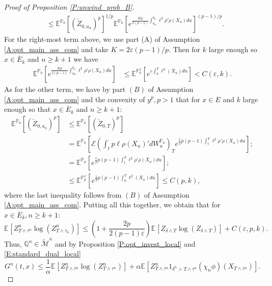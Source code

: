 \documentclass[11pt, letterpaper]{amsart}
\theoremstyle{definition}
\theoremstyle{remark}
\numberwithin{equation}{section}
\newcommand{\eps}{\varepsilon}
\newcommand{\prob}{\mathbb{P}}
\newcommand{\qprob}{\mathbb{Q}}
\newcommand{\esp}{\mathbb{E}}
\newcommand{\espalt}[2]{\esp^{#1}\bra{#2}}
\newcommand{\tM}{\widetilde{\mathcal{M}}}
\newcommand{\EN}{\mathcal{E}}
\newcommand{\bra}[1]{\left[#1\right]}
\newcommand{\ol}[1]{\overline{#1}}
\begin{document}
\begin{proof}[Proof of Proposition \ref{P:unwind_prob_B}]
\begin{equation*}
\begin{split}
&\leq \espalt{\prob_0}{\left(\check{Z}_{0,a_n}\right)^p}^{1/p}\espalt{\prob_0}{e^{\frac{Kp}{2(p-1)}\int_{a_n}^{b_n} \ell^2\rho'\rho(X_u)du}}^{(p-1)/p}.
\end{split}
\end{equation*}
For the right-most term above, we use part (A) of Assumption \ref{A:opt_main_ass_com} and take $K=2\eps(p-1)/p$. Then for $k$ large enough so $x\in\ol{E}_k$ and $n\geq k+1$ we have
\begin{equation*}
\begin{split}
\espalt{\prob_0}{e^{\frac{Kp}{2(p-1)}\int_{a_n}^{b_n} \ell^2\rho'\rho(X_u)du}} &\leq \espalt{\prob^x_0}{e^{\eps\int_0^T \ell^2(X_u)du}} < C(\eps, k).
\end{split}
\end{equation*}
As for the other term, we have by part $(B)$ of Assumption \ref{A:opt_main_ass_com} and the convexity of $y^p, p>1$ that for $x\in E$ and $k$ large enough so that $x\in \ol{E}_k$ and $n\geq k+1$:
\begin{equation*}
\begin{split}
\espalt{\prob_0}{\left(\check{Z}_{0,a_n}\right)^p}&\leq \espalt{\prob_0}{\left(\check{Z}_{0,T}\right)^p}\\
&= \espalt{\prob_0}{\EN\left(\int_t^\cdot p\ell\rho(X_u)'dW^{\prob_0}_u\right)_Te^{\frac{1}{2}p(p-1)\int_t^T \ell^2\rho'\rho(X_u)du}};\\
&= \espalt{\prob_{p}}{e^{\frac{1}{2}p(p-1)\int_t^T \ell^2\rho'\rho(X_u)du}};\\
&\leq \espalt{\prob^x_{p}}{e^{\frac{1}{2}p(p-1)\int_0^T \ell^2(X_u)du}} \leq C(p,k),
\end{split}
\end{equation*}
where the last inequality follows from $(B)$ of Assumption \ref{A:opt_main_ass_com}. Putting all this together, we obtain that for $x\in \ol{E}_k, n\geq k+1$:
\begin{equation}\label{E:Z_n_long_calc}
\espalt{}{Z^n_{T\wedge\tau^n}\log\left(Z^n_{T\wedge \tau_n}\right)} \leq \left(1+\frac{2p}{2(p-1)\eps}\right)\espalt{}{Z_{\delta\wedge T}\log\left(Z_{\delta\wedge T}\right)} + C(\eps,p, k).
\end{equation}
Thus, $\qprob^n\in\tM^n$ and by Proposition \ref{P:opt_invest_local} and \eqref{E:standard_dual_local}
\begin{equation}\label{E:G_n_ub_1_com}
G^n(t,x) \leq \frac{1}{\alpha}\espalt{}{Z^n_{T\wedge\tau^n}\log\left(Z^n_{T\wedge\tau^n}\right)} + \alpha\espalt{}{Z^n_{T\wedge\tau^n}1_{\delta^n>T\wedge\tau^n}(\chi_n\phi)(X_{T\wedge\tau^n})}.

\end{equation}
\end{proof}
\end{document}
